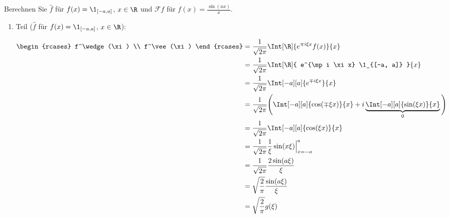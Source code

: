 
\begin{exercise}

Berechnen Sie $\hat f$ für $f(x) = \1_{[-a, a]}$, $x \in \R$ und $\mathcal{F} f$ für $f(x) = \frac{\sin(a x)}{x}$.

\end{exercise}


\begin{solution}

\phantom{}

\begin{enumerate}[label = \arabic*.]

    \item Teil ($\hat f$ für $f(x) = \1_{[-a, a]}$, $x \in \R$):
    
    \begin{align*}
        \begin{rcases}
            f^\wedge(\xi) \\
            f^\vee(\xi)
        \end{rcases}
        & =
        \frac{1}{\sqrt{2 \pi}}
        \Int[\R]
        {
            e^{\mp i \xi x}
            f(x)
        }{x} \\
        & =
        \frac{1}{\sqrt{2 \pi}}
        \Int[\R]
        {
            e^{\mp i \xi x}
            \1_{[-a, a]}
        }{x} \\
        & =
        \frac{1}{\sqrt{2 \pi}}
        \Int[-a][a]
        {
            e^{\mp i \xi x}
        }{x} \\
        & =
        \frac{1}{\sqrt{2 \pi}}
        \Bigg (
            \Int[-a][a]
            {
                \cos(\mp \xi x)
            }{x}
            +
            i
            \underbrace
            {
                \Int[-a][a]
                {
                    \sin(\xi x)
                }{x}
            }_0
        \Bigg ) \\
        & =
        \frac{1}{\sqrt{2 \pi}}
        \Int[-a][a]
        {
            \cos(\xi x)
        }{x} \\
        & =
        \frac{1}{\sqrt{2 \pi}}
        \frac{1}{\xi}
        \sin(x \xi) \Big |_{x = -a}^a \\
        & =
        \frac{1}{\sqrt{2 \pi}}
        \frac{2 \sin(a \xi)}{\xi} \\
        & =
        \sqrt \frac{2}{\pi}
        \frac{\sin(a \xi)}{\xi} \\
        & =
        \sqrt \frac{2}{\pi}
        g(\xi)
    \end{align*}


\end{enumerate}
\end{solution}
